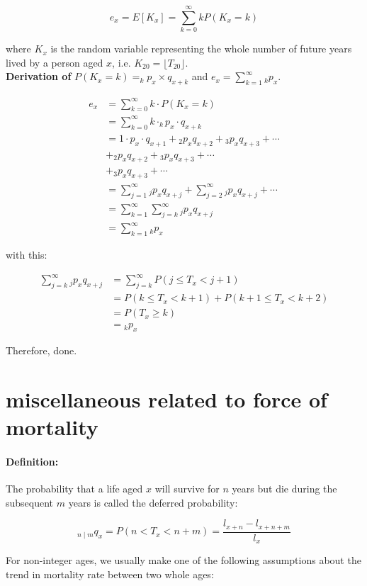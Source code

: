 \documentclass[a4paper, 11pt, twoside]{article}
\begin{document}
\[e_x=E[K_x]=\sum^\infty_{k=0}kP(K_x=k)\]

where $K_x$ is the random variable representing the whole number of future years lived by a person aged $x$, i.e. $K_{20}=\lfloor T_{20}\rfloor$.\\

\textbf{Derivation of }$P(K_x=k)=_kp_x\times q_{x+k}$ and $e_x=\sum^\infty_{k=1}{}_kp_x$.

\[
\begin{split}
	e_x&=\sum^\infty_{k=0}k\cdot P(K_x=k)\\
	&=\sum^\infty_{k=0}k\cdot_kp_x\cdot q_{x+k}\\
	&=1\cdot p_x\cdot q_{x+1} + {}_2p_xq_{x+2} + {}_3p_xq_{x+3}+\cdots\\
	&+{}_2p_xq_{x+2}+{}_3p_xq_{x+3}+\cdots\\
	&+{}_3p_xq_{x+3}+\cdots\\
	&=\sum^\infty_{j=1}{}_jp_xq_{x+j}+\sum^\infty_{j=2}{}_jp_xq_{x+j}+\cdots\\
	&=\sum^\infty_{k=1}\sum^\infty_{j=k}{}_jp_xq_{x+j}\\
	&=\sum^\infty_{k=1}{}_kp_x
\end{split}
\]

with this:

\[
\begin{split}
	\sum^\infty_{j=k}{}_jp_xq_{x+j}&=\sum^\infty_{j=k}P(j\leq T_x < j+1)\\
	&=P(k\leq T_x<k+1)+P(k+1\leq T_x < k+2)\\
	&=P(T_x\geq k)\\
	&={}_kp_x
\end{split}
\]

Therefore, done.

\section{miscellaneous related to force of mortality}

\paragraph{Definition:} The probability that a life aged $x$ will survive for $n$ years but die during the subsequent $m$ years is called the deferred probability:

\[{}_{n\mid m}q_x=P(n<T_x<n+m)=\frac{l_{x+n}-l_{x+n+m}}{l_x}\]

For non-integer ages, we usually make one of the following assumptions about the trend in mortality rate between two whole ages:
\end{document}
